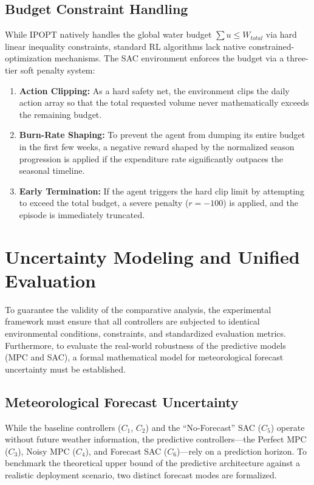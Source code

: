\documentclass[11pt, a4paper]{article}
\begin{document}
\subsection{Budget Constraint Handling}

While IPOPT natively handles the global water budget $\sum u \le W_{total}$ via hard linear inequality constraints, standard RL algorithms lack native constrained-optimization mechanisms. The SAC environment enforces the budget via a three-tier soft penalty system:

\begin{enumerate}
    \item \textbf{Action Clipping:} As a hard safety net, the environment clips the daily action array so that the total requested volume never mathematically exceeds the remaining budget.
    \item \textbf{Burn-Rate Shaping:} To prevent the agent from dumping its entire budget in the first few weeks, a negative reward shaped by the normalized season progression is applied if the expenditure rate significantly outpaces the seasonal timeline.
    \item \textbf{Early Termination:} If the agent triggers the hard clip limit by attempting to exceed the total budget, a severe penalty ($r = -100$) is applied, and the episode is immediately truncated.
\end{enumerate}

\section{Uncertainty Modeling and Unified Evaluation}

To guarantee the validity of the comparative analysis, the experimental framework must ensure that all controllers are subjected to identical environmental conditions, constraints, and standardized evaluation metrics. Furthermore, to evaluate the real-world robustness of the predictive models (MPC and SAC), a formal mathematical model for meteorological forecast uncertainty must be established.

\subsection{Meteorological Forecast Uncertainty}

While the baseline controllers ($C_1$, $C_2$) and the ``No-Forecast'' SAC ($C_5$) operate without future weather information, the predictive controllers---the Perfect MPC ($C_3$), Noisy MPC ($C_4$), and Forecast SAC ($C_6$)---rely on a prediction horizon. To benchmark the theoretical upper bound of the predictive architecture against a realistic deployment scenario, two distinct forecast modes are formalized.
\end{document}
